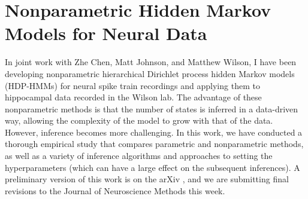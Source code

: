  
\chapter{Nonparametric Hidden Markov Models for Neural Data}

In joint work with Zhe Chen, Matt Johnson, and Matthew Wilson, I have been 
developing nonparametric hierarchical Dirichlet process hidden Markov models 
(HDP-HMMs) for neural spike train recordings and applying them to hippocampal 
data recorded in the Wilson lab. The advantage of these nonparametric methods 
is that the number of states is inferred in a data-driven way, allowing the 
complexity of the model to grow with that of the data. However, inference 
becomes more challenging. In this work, we have conducted a thorough empirical 
study that compares parametric and nonparametric methods, as well as a 
variety of inference algorithms and approaches to setting the hyperparameters 
(which can have a large effect on the subsequent inferences). A preliminary 
version of this work is on the arXiv \cite{linderman2014nonparametric}, and 
we are submitting final revisions to the Journal of Neuroscience Methods 
this week. 


